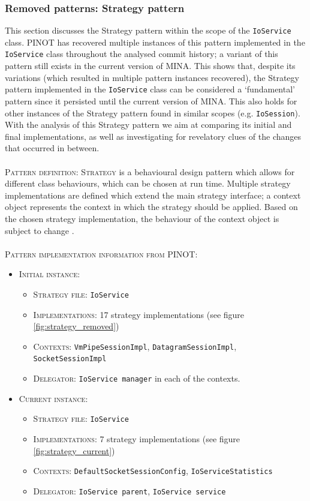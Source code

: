 \subsubsection{Removed patterns: Strategy pattern}
This section discusses the Strategy pattern within the scope of the \texttt{IoService} class. PINOT has recovered multiple instances of this pattern implemented in the \texttt{IoService} class throughout the analysed commit history; a variant of this pattern still exists in the current version of MINA. This shows that, despite its variations (which resulted in multiple pattern instances recovered), the Strategy pattern implemented in the \texttt{IoService} class can be considered a `fundamental' pattern since it persisted until the current version of MINA. This also holds for other instances of the Strategy pattern found in similar scopes (e.g. \texttt{IoSession}). With the analysis of this Strategy pattern we aim at comparing its initial and final implementations, as well as investigating for revelatory clues of the changes that occurred in between.\\\\
\textsc{Pattern definition}: \textsc{Strategy} is a behavioural design pattern which allows for different class behaviours, which can be chosen at run time. Multiple strategy implementations are defined which extend the main strategy interface; a context object represents the context in which the strategy should be applied. Based on the chosen strategy implementation, the behaviour of the context object is subject to change \cite{strategy}\cite{strategy1}.\\\\
\textsc{Pattern implementation information from PINOT}:
\begin{itemize}
    \item \textsc{Initial instance}:
        \begin{itemize}
            \item \textsc{Strategy file}: \texttt{IoService}
            \item \textsc{Implementations}: 17 strategy implementations (see figure \ref{fig:strategy_removed})
            \item \textsc{Contexts}: \texttt{VmPipeSessionImpl}, \texttt{DatagramSessionImpl}, \texttt{SocketSessionImpl}
            \item \textsc{Delegator}: \texttt{IoService manager} in each of the contexts. 
        \end{itemize}
    \item \textsc{Current instance}:
        \begin{itemize}
            \item \textsc{Strategy file}: \texttt{IoService}
            \item \textsc{Implementations}: 7 strategy implementations (see figure \ref{fig:strategy_current})
            \item \textsc{Contexts}: \texttt{DefaultSocketSessionConfig}, \texttt{IoServiceStatistics}
            \item \textsc{Delegator}: \texttt{IoService parent}, \texttt{IoService service} 
        \end{itemize}
\end{itemize}
